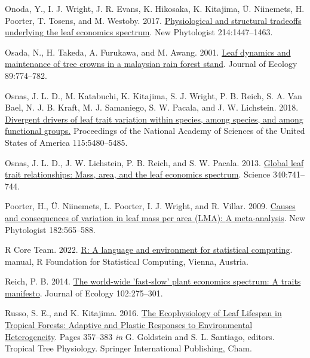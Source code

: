 \documentclass[
  12pt,
  letterpaper,
  DIV=11,
  numbers=noendperiod]{scrartcl}
\newlength{\cslhangindent}
\newlength{\cslentryspacingunit} %
\newenvironment{CSLReferences}[2] %
 {%
  \setlength{\parindent}{0pt}
  \ifodd #1
  \let\oldpar\par
  \def\par{\hangindent=\cslhangindent\oldpar}
  \fi
  \setlength{\parskip}{#2\cslentryspacingunit}
 }%
 {}
\begin{document}
\begin{CSLReferences}{1}{0}
\leavevmode{}%
Onoda, Y., I. J. Wright, J. R. Evans, K. Hikosaka, K. Kitajima, Ü.
Niinemets, H. Poorter, T. Tosens, and M. Westoby. 2017.
\href{https://doi.org/10.1111/nph.14496}{Physiological and structural
tradeoffs underlying the leaf economics spectrum}. New Phytologist
214:1447--1463.

\leavevmode{}%
Osada, N., H. Takeda, A. Furukawa, and M. Awang. 2001.
\href{https://doi.org/10.1046/j.0022-0477.2001.00590.x}{Leaf dynamics
and maintenance of tree crowns in a malaysian rain forest stand}.
Journal of Ecology 89:774--782.

\leavevmode{}%
Osnas, J. L. D., M. Katabuchi, K. Kitajima, S. J. Wright, P. B. Reich,
S. A. Van Bael, N. J. B. Kraft, M. J. Samaniego, S. W. Pacala, and J. W.
Lichstein. 2018.
\href{https://doi.org/10.1073/pnas.1803989115}{Divergent drivers of leaf
trait variation within species, among species, and among functional
groups.} Proceedings of the National Academy of Sciences of the United
States of America 115:5480--5485.

\leavevmode{}%
Osnas, J. L. D., J. W. Lichstein, P. B. Reich, and S. W. Pacala. 2013.
\href{https://doi.org/10.1126/science.1231574}{Global leaf trait
relationships: {Mass}, area, and the leaf economics spectrum}. Science
340:741--744.

\leavevmode{}%
Poorter, H., Ü. Niinemets, L. Poorter, I. J. Wright, and R. Villar.
2009. \href{https://doi.org/10.1111/j.1469-8137.2009.02830.x}{Causes and
consequences of variation in leaf mass per area ({LMA}): {A}
meta-analysis}. New Phytologist 182:565--588.

\leavevmode{}%
R Core Team. 2022. \href{https://www.R-project.org/}{R: {A} language and
environment for statistical computing}. manual, {R Foundation for
Statistical Computing}, {Vienna, Austria}.

\leavevmode{}%
Reich, P. B. 2014. \href{https://doi.org/10.1111/1365-2745.12211}{The
world-wide 'fast-slow' plant economics spectrum: {A} traits manifesto}.
Journal of Ecology 102:275--301.

\leavevmode{}%
Russo, S. E., and K. Kitajima. 2016.
\href{https://doi.org/10.1007/978-3-319-27422-5_17}{The {Ecophysiology}
of {Leaf Lifespan} in {Tropical Forests}: {Adaptive} and {Plastic
Responses} to {Environmental Heterogeneity}}. Pages 357--383 \emph{in}
G. Goldstein and S. L. Santiago, editors. Tropical {Tree Physiology}.
{Springer International Publishing}, {Cham}.


\end{CSLReferences}
\end{document}
